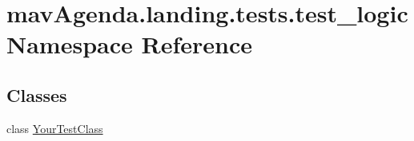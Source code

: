 \hypertarget{namespacemavAgenda_1_1landing_1_1tests_1_1test__logic}{}\section{mav\+Agenda.\+landing.\+tests.\+test\+\_\+logic Namespace Reference}
\label{namespacemavAgenda_1_1landing_1_1tests_1_1test__logic}
\subsection*{Classes}
\begin{DoxyCompactItemize}
\item 
class \mbox{\hyperlink{classmavAgenda_1_1landing_1_1tests_1_1test__logic_1_1YourTestClass}{Your\+Test\+Class}}
\end{DoxyCompactItemize}
